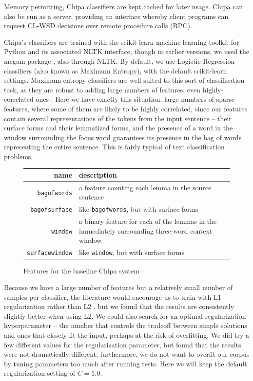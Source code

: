 Memory permitting, Chipa classifiers are kept cached for later usage. Chipa can
also be run as a server, providing an interface whereby client programs can
request CL-WSD decisions over remote procedure calls (RPC).

Chipa's classifiers are trained with the scikit-learn machine learning toolkit
\cite{scikit-learn} for Python and its associated NLTK interface, though in
earlier versions, we used the megam package \cite{daume04cg-bfgs}, also through
NLTK. By default, we use Logistic Regression classifiers (also known as
Maximum Entropy), with the default scikit-learn settings.
Maximum entropy classifiers are well-suited to this sort of classification
task, as they are robust to adding large numbers of features, even
highly-correlated ones \cite{nigam1999using}. Here we have exactly this
situation, large numbers of sparse features, where some of them are likely to
be highly correlated, since our features contain several representations of the
tokens from the input sentence -- their surface forms and their lemmatized
forms, and the presence of a word in the window surrounding the focus word
guarantees its presence in the bag of words representing the entire sentence.
This is fairly typical of text classification problems.

\begin{figure}
  \begin{centering}
  \begin{tabular}{|r|p{11cm}|}
    \hline
    name          & description  \\
    \hline
    \texttt{bagofwords}    & a feature counting each lemma in the source sentence \\
    \hline
    \texttt{bagofsurface}  & like \texttt{bagofwords}, but with surface forms \\
    \hline
    \texttt{window}       & a binary feature for each of the lemmas in the immediately surrounding three-word context window \\
    \hline
    \texttt{surfacewindow} & like \texttt{window}, but with surface forms \\
    \hline
  \end{tabular}
  \end{centering}
  \caption{Features for the baseline Chipa system}
  \label{fig:baselinefeatures}
\end{figure}

Because we have a large number of features but a relatively small
number of samples per classifier, the literature would encourage us to train
with L1 regularization rather than L2 \cite{ng2004feature}, but we found that
the results are consistently slightly better when using L2. We could also
search for an optimal regularization hyperparameter -- the number that controls
the tradeoff between simple solutions and ones that closely fit the input,
perhaps at the risk of overfitting. We did try a few different values for the
regularization parameter, but found that the results were not dramatically
different; furthermore, we do not want to overfit our corpus by tuning
parameters too much after running tests. Here we will keep the default
regularization setting of $C=1.0$.

